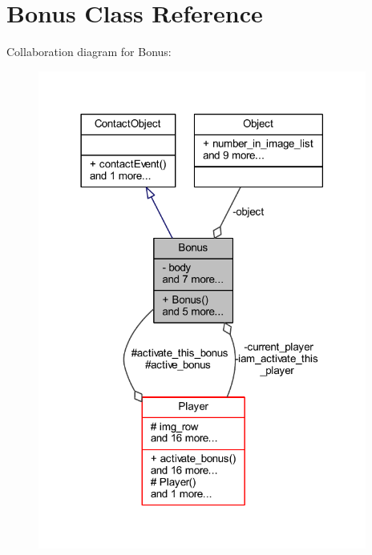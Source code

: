 \hypertarget{class_bonus}{}\section{Bonus Class Reference}
\label{class_bonus}


Collaboration diagram for Bonus\+:\nopagebreak
\begin{figure}[H]
\begin{center}
\leavevmode
\includegraphics[width=306pt]{class_bonus__coll__graph}
\end{center}
\end{figure}
